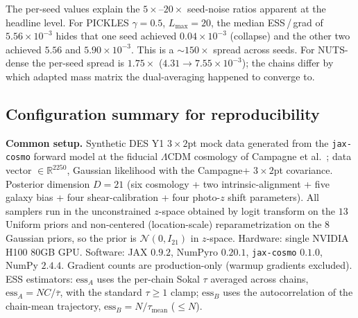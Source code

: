 \documentclass{article}
\newcommand{\R}{\mathbb{R}}
\newcommand{\gN}{\mathcal{N}}
\begin{document}
The per-seed values explain the $5\!\times$--$20\!\times$ seed-noise
ratios apparent at the headline level.  For PICKLES $\gamma=0.5$,
$L_{\max}=20$, the median ESS\,/\,grad of $5.56\!\times\!10^{-3}$ hides
that one seed achieved $0.04\!\times\!10^{-3}$ (collapse) and the other
two achieved $5.56$ and $5.90\!\times\!10^{-3}$.  This is a $\sim\!150\!\times$
spread across seeds.  For NUTS-dense the per-seed spread is $1.75\!\times$
($4.31\to 7.55\!\times\!10^{-3}$); the chains differ by which
adapted mass matrix the dual-averaging happened to converge to.

\subsection{Configuration summary for reproducibility}\label{ssec:desConfig}

\textbf{Common setup.}  Synthetic DES Y1 $3\times 2$pt mock data
generated from the \texttt{jax-cosmo} forward model at the fiducial
$\Lambda$CDM cosmology of Campagne et al.\ \cite{campagne2023jax};
data vector $\in \R^{2250}$, Gaussian likelihood with the Campagne+
$3\times 2$pt covariance.  Posterior dimension $D=21$ (six cosmology +
two intrinsic-alignment + five galaxy bias + four shear-calibration +
four photo-$z$ shift parameters).  All samplers run in the unconstrained
$z$-space obtained by logit transform on the $13$ Uniform priors and
non-centered (location-scale) reparametrization on the $8$ Gaussian
priors, so the prior is $\gN(0, I_{21})$ in $z$-space.  Hardware:
single NVIDIA H100 80GB GPU.  Software: JAX $0.9.2$, NumPyro $0.20.1$,
\texttt{jax-cosmo} $0.1.0$, NumPy $2.4.4$.  Gradient counts are
production-only (warmup gradients excluded).  ESS estimators:
$\mathrm{ess}_A$ uses the per-chain Sokal $\tau$ averaged across chains,
$\mathrm{ess}_A = NC/\overline{\tau}$, with the standard $\tau\ge 1$
clamp; $\mathrm{ess}_B$ uses the autocorrelation of the chain-mean
trajectory, $\mathrm{ess}_B = N/\tau_{\text{mean}}$ ($\le N$).
\end{document}
